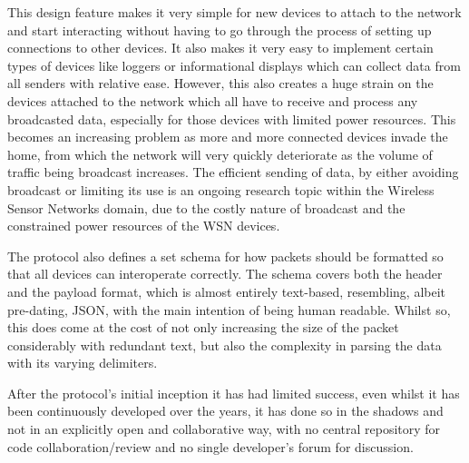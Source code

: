 This design feature makes it very simple for new devices to attach to the network and start interacting without having to go through the process of setting up connections to other devices. It also makes it very easy to implement certain types of devices like loggers or informational displays which can collect data from all senders with relative ease. However, this also creates a huge strain on the devices attached to the network which all have to receive and process any broadcasted data, especially for those devices with limited power resources. This becomes an increasing problem as more and more connected devices invade the home, from which the network will very quickly deteriorate as the volume of traffic being broadcast increases. The efficient sending of data, by either avoiding broadcast or limiting its use is an ongoing research topic within the Wireless Sensor Networks domain, due to the costly nature of broadcast and the constrained power resources of the WSN devices.\cite{RumourRouting}\cite{DirectedDiffusion}

The protocol also defines a set schema for how packets should be formatted so that all devices can interoperate correctly. The schema covers both the header and the payload format, which is almost entirely text-based, resembling, albeit pre-dating, JSON, with the main intention of being human readable. Whilst so, this does come at the cost of not only increasing the size of the packet considerably with redundant text, but also the complexity in parsing the data with its varying delimiters. 

After the protocol's initial inception it has had limited success, even whilst it has been continuously developed over the years, it has done so in the shadows and not in an explicitly open and collaborative way, with no central repository for code collaboration/review and no single developer's forum for discussion. %

